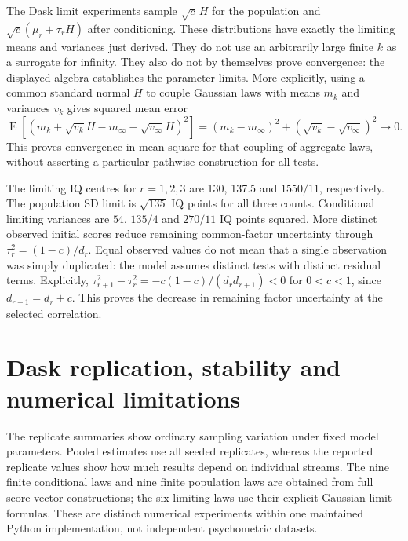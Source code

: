 The Dask limit experiments sample \(\sqrt c\,H\) for the population and
\(\sqrt c(\mu_r+\tau_rH)\) after conditioning. These distributions have
exactly the limiting means and variances just derived. They do not use
an arbitrarily large finite \(k\) as a surrogate for infinity. They
also do not by themselves prove convergence: the displayed algebra
establishes the parameter limits. More explicitly, using a common
standard normal \(H\) to couple Gaussian laws with means \(m_k\) and
variances \(v_k\) gives squared mean error
\[
 \operatorname{E}\left[
 (m_k+\sqrt{v_k}H-m_\infty-\sqrt{v_\infty}H)^2\right]
 =(m_k-m_\infty)^2+(\sqrt{v_k}-\sqrt{v_\infty})^2\longrightarrow0.
\]
This proves convergence in mean square for that coupling of aggregate
laws, without asserting a particular pathwise construction for all tests.


\begingroup
\let\subsection\section

\endgroup

The limiting IQ centres for \(r=1,2,3\) are 130, 137.5 and
\(1550/11\), respectively. The population SD limit is
\(\sqrt{135}\) IQ points for all three counts. Conditional limiting
variances are \(54\), \(135/4\) and \(270/11\) IQ points squared.
More distinct observed initial scores reduce remaining common-factor
uncertainty through \(\tau_r^2=(1-c)/d_r\). Equal observed values do
not mean that a single observation was simply duplicated: the model
assumes distinct tests with distinct residual terms.
Explicitly,
\(\tau_{r+1}^2-\tau_r^2=-c(1-c)/(d_rd_{r+1})<0\) for \(0<c<1\),
since \(d_{r+1}=d_r+c\). This proves the decrease in remaining factor
uncertainty at the selected correlation.



\chapter{Dask replication, stability and numerical limitations}
\label{sec:seq-sim-replication}



The replicate summaries show ordinary sampling variation under fixed
model parameters. Pooled estimates use all \SimReplicates{} seeded replicates,
whereas the reported replicate values show how much results depend on
individual streams. The nine finite conditional laws and nine finite
population laws are obtained from full score-vector constructions;
the six limiting laws use their explicit Gaussian limit formulas.
These are distinct numerical experiments within one maintained Python
implementation, not independent psychometric datasets.

